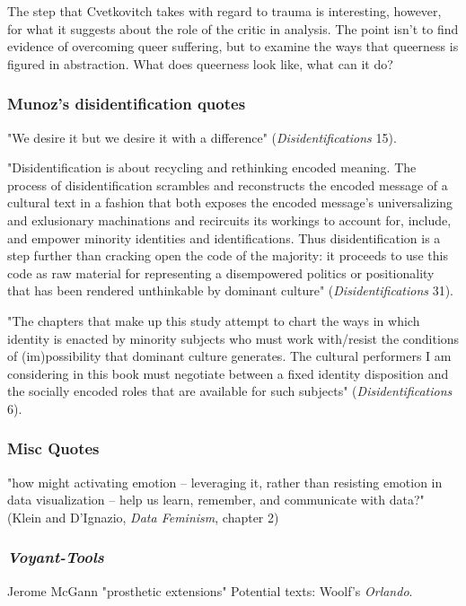 \documentclass[11pt]{article}
\begin{document}
The step that Cvetkovitch takes with regard to trauma is interesting,
however, for what it suggests about the role of the critic in
analysis. The point isn't to find evidence of overcoming queer
suffering, but to examine the ways that queerness is figured in
abstraction. What does queerness look like, what can it do? 

\subsubsection{Munoz's disidentification quotes}
\label{sec:org388a987}

"We desire it but we desire it with a difference"
(\emph{Disidentifications} 15).

"Disidentification is about recycling and rethinking encoded
meaning. The process of disidentification scrambles and reconstructs
the encoded message of a cultural text in a fashion that both exposes
the encoded message's universalizing and exlusionary machinations and
recircuits its workings to account for, include, and empower minority
identities and identifications. Thus disidentification is a step
further than cracking open the code of the majority: it proceeds to
use this code as raw material for representing a disempowered politics
or positionality that has been rendered unthinkable by dominant
culture" (\emph{Disidentifications} 31).

"The chapters that make up this study attempt to chart the ways
in which identity is enacted by minority subjects who must work
with/resist the conditions of (im)possibility that dominant culture
generates. The cultural performers I am considering in this book must
negotiate between a fixed identity disposition and the socially
encoded roles that are available for such subjects"
(\emph{Disidentifications} 6). 

\subsubsection{Misc Quotes}
\label{sec:org8159fd3}
"how might activating emotion – leveraging it, rather than resisting
emotion in data visualization – help us learn, remember, and
communicate with data?" (Klein and D'Ignazio, \emph{Data Feminism},
chapter 2)

\subsubsection{\emph{Voyant-Tools}}
\label{sec:orgd7d6d8c}
Jerome McGann "prosthetic extensions"
Potential texts: Woolf's \emph{Orlando}. 
\end{document}
